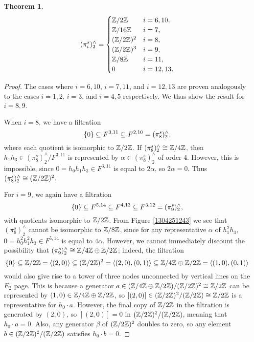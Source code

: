 \documentclass[11pt, titlepage]{article} %
\def\subq{\ensuremath\subseteq}
\def\inte{\ensuremath\mathbb{Z}}
\numberwithin{equation}{subsection}
\theoremstyle{plain}
\newtheorem{theorem}{Theorem}[subsection]
\theoremstyle{definition}
\begin{document}
\begin{theorem}
\[(\pi_i^s)^\wedge_2=\begin{cases}
\inte/2\inte & i = 6, 10,\\
\inte/16\inte & i = 7,\\
(\inte/2\inte)^2 & i = 8,\\
(\inte/2\inte)^3 & i = 9,\\
\inte/8\inte & i = 11,\\
0 & i = 12, 13.
\end{cases}\]
\end{theorem}

\begin{proof}
The cases where \(i=6,10\), \(i=7, 11\), and \(i=12,13\) are proven analogously to the cases \(i=1, 2\), \(i=3\), and \(i=4,5\) respectively. We thus show the result for \(i=8,9\).

When \(i=8\), we have a filtration
\[\{0\}\subq F^{3,11}\subq F^{2,10}=(\pi^s_8)^\wedge_2,\]
where each quotient is isomorphic to \(\inte/2\inte\). If \((\pi^s_8)^\wedge_2\cong \inte/4\inte\), then \(h_1h_3\in (\pi^s_8)^\wedge_2/F^{3,11}\) is represented by \(\alpha\in (\pi^s_8)^\wedge_2\) of order 4. However, this is impossible, since \(0=h_0h_1h_3\in F^{3,11}\) is equal to \(2\alpha\), so \(2\alpha=0\). Thus \((\pi^s_8)^\wedge_2 \cong (\inte/2\inte)^2\).

For \(i=9\), we again have a filtration
\[\{0\}\subq F^{5,14}\subq F^{4,13}\subq F^{3, 12}=(\pi^s_9)^\wedge_2,\]
with quotients isomorphic to \(\inte/2\inte\). From Figure \ref{1304251243} we see that \((\pi^s_9)^\wedge_2\) cannot be isomorphic to \(\inte/8\inte\), since for any representative \(\alpha\) of \(h_1^2h_3\), \(0=h_0^2h_1^2h_3\in F^{5,14}\) is equal to \(4\alpha\). However, we cannot immediately discount the possibility that \((\pi^s_9)^\wedge_2\cong \inte/4\inte\oplus \inte/2\inte\); indeed, the filtration 
\[\{0\}\subq \inte/2\inte=\ang{(2,0)} \subq (\inte/2\inte)^2=\ang{(2,0),(0,1)} \subq \inte/4\inte \oplus \inte/2\inte=\ang{(1,0), (0,1)}\]
would also give rise to a tower of three nodes unconnected by vertical lines on the \(E_2\) page. This is because a generator \(a \in (\inte/4\inte\oplus\inte/2\inte)/(\inte/2\inte)^2\cong \inte/2\inte\) can be represented by \((1,0)\in \inte/4\inte\oplus\inte/2\inte\), so \([(2,0)]\in (\inte/2\inte)^2/(\inte/2\inte)\cong \inte/2\inte\) is a representative for \(h_0\cdot a\). However, the final copy of \(\inte/2\inte\) in the filtration is generated by \((2,0)\), so \([(2,0)]=0\) in \((\inte/2\inte)^2/(\inte/2\inte)\), meaning that \(h_0\cdot a=0\). Also, any generator \(\beta\) of \((\inte/2\inte)^2\) doubles to zero, so any element \(b\in (\inte/2\inte)^2/(\inte/2\inte)\) satisfies \(h_0\cdot b =0\). 


\end{proof}
\end{document}
